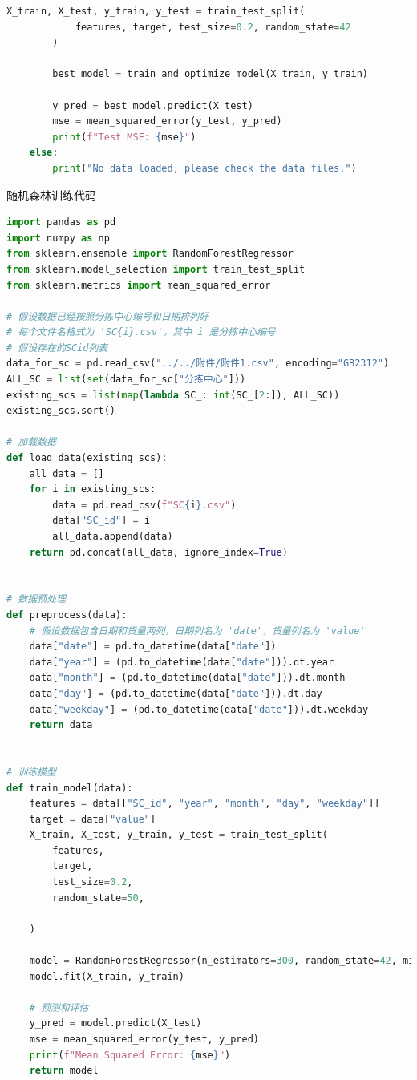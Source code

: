 \documentclass[UTF8,a4paper,10 pt]{article}%
\begin{document}
\begin{lstlisting}[language=python]
        X_train, X_test, y_train, y_test = train_test_split(
            features, target, test_size=0.2, random_state=42
        )

        best_model = train_and_optimize_model(X_train, y_train)

        y_pred = best_model.predict(X_test)
        mse = mean_squared_error(y_test, y_pred)
        print(f"Test MSE: {mse}")
    else:
        print("No data loaded, please check the data files.")
\end{lstlisting}

\noindent 随机森林训练代码
\begin{lstlisting}[language=python]
import pandas as pd
import numpy as np
from sklearn.ensemble import RandomForestRegressor
from sklearn.model_selection import train_test_split
from sklearn.metrics import mean_squared_error

# 假设数据已经按照分拣中心编号和日期排列好
# 每个文件名格式为 'SC{i}.csv'，其中 i 是分拣中心编号
# 假设存在的SCid列表
data_for_sc = pd.read_csv("../../附件/附件1.csv", encoding="GB2312")
ALL_SC = list(set(data_for_sc["分拣中心"]))
existing_scs = list(map(lambda SC_: int(SC_[2:]), ALL_SC))
existing_scs.sort()

# 加载数据
def load_data(existing_scs):
    all_data = []
    for i in existing_scs:
        data = pd.read_csv(f"SC{i}.csv")
        data["SC_id"] = i
        all_data.append(data)
    return pd.concat(all_data, ignore_index=True)


# 数据预处理
def preprocess(data):
    # 假设数据包含日期和货量两列，日期列名为 'date'，货量列名为 'value'
    data["date"] = pd.to_datetime(data["date"])
    data["year"] = (pd.to_datetime(data["date"])).dt.year
    data["month"] = (pd.to_datetime(data["date"])).dt.month
    data["day"] = (pd.to_datetime(data["date"])).dt.day
    data["weekday"] = (pd.to_datetime(data["date"])).dt.weekday
    return data


# 训练模型
def train_model(data):
    features = data[["SC_id", "year", "month", "day", "weekday"]]
    target = data["value"]
    X_train, X_test, y_train, y_test = train_test_split(
        features,
        target,
        test_size=0.2,
        random_state=50,

    )

    model = RandomForestRegressor(n_estimators=300, random_state=42, min_samples_split=20)
    model.fit(X_train, y_train)

    # 预测和评估
    y_pred = model.predict(X_test)
    mse = mean_squared_error(y_test, y_pred)
    print(f"Mean Squared Error: {mse}")
    return model



\end{lstlisting}
\end{document}
